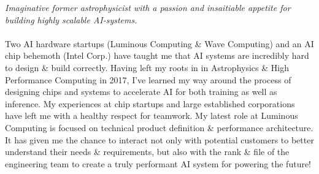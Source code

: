\documentclass[10pt,a4paper]{article}
\begin{document}
\vspace{-1.3em}  %
\begin{multicols}{2}  %
\noindent \emph{Imaginative former astrophysicist with a passion and insaitiable appetite for building highly scalable AI-systems.}
\\
\\
Two AI hardware startups (Luminous Computing \& Wave Computing) and an AI chip behemoth (Intel Corp.) have taught me that AI systems are incredibly hard to design \& build correctly. Having left my roots in in Astrophysics \& High Performance Computing in 2017, I've learned my way around the process of designing chips and systems to accelerate AI for both training as well as inference. My experiences at chip startups and large established corporations have left me with a healthy respect for teamwork. My latest role at Luminous Computing is focused on technical product definition \& performance architecture. It has given me the chance to interact not only with potential customers to better understand their needs \& requirements, but also with the rank \& file of the engineering team to create a truly performant AI system for powering the future!   






\end{multicols}
\end{document}

